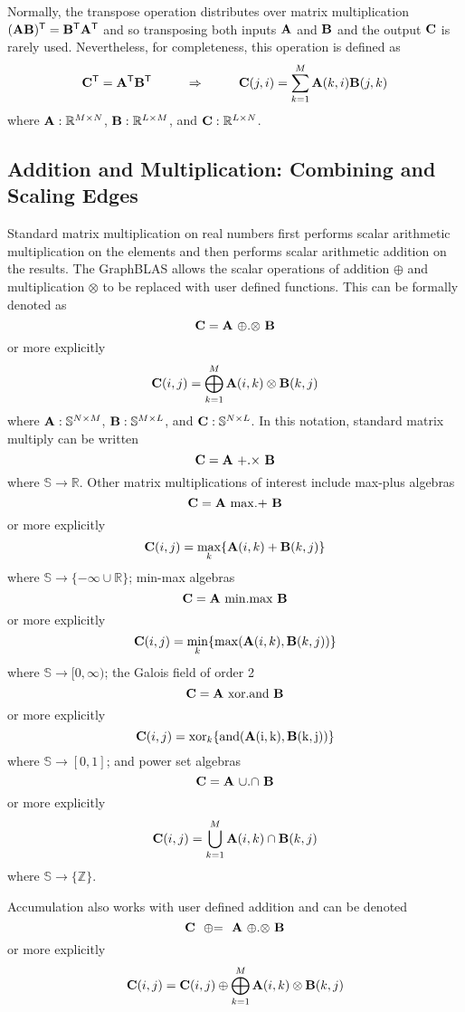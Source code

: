 Normally, the transpose operation distributes over matrix multiplication $({\bf A} {\bf B})^{\sf T} ={\bf B}^{\sf T} {\bf A}^{\sf T}$ and so transposing both inputs ${\bf A}$ and ${\bf B}$ and the output ${\bf C}$ is rarely used.  Nevertheless, for completeness, this operation is defined as
$$
   {\bf C}^{\sf T} = {\bf A}^{\sf T} {\bf B}^{\sf T} ~~~~~~~~ \Rightarrow ~~~~~~~~ {\bf C}(j,i) = \sum_{k=1}^M {\bf A}(k,i) {\bf B}(j,k)
$$
where ${\bf A}: \mathbb{R}^{M \times N}$, ${\bf B}: \mathbb{R}^{L \times M}$, and ${\bf C}: \mathbb{R}^{L \times N}$.

\subsection{Addition and Multiplication: Combining and Scaling Edges}
  Standard matrix multiplication on real numbers first performs scalar arithmetic multiplication on the elements and then performs scalar arithmetic addition on the results.  The GraphBLAS allows the scalar operations of addition $\oplus$ and multiplication $\otimes$ to be replaced with user defined functions.  This can be formally denoted as
$$
   {\bf C} = {\bf A} ~ {\oplus}.{\otimes} ~ {\bf B}
$$
or more explicitly
$$
   {\bf C}(i,j) = \bigoplus_{k=1}^M {\bf A}(i,k) \otimes {\bf B}(k,j)
$$
where ${\bf A}: \mathbb{S}^{N \times M}$,  ${\bf B}: \mathbb{S}^{M \times L}$, and ${\bf C}: \mathbb{S}^{N \times L}$.  In this notation, standard matrix multiply can be written
$$
   {\bf C} = {\bf A} ~ {+}.{\times} ~ {\bf B}
$$
where $\mathbb{S} \rightarrow \mathbb{R}$. Other matrix multiplications of interest include max-plus algebras
$$
   {\bf C} = {\bf A} ~ {\max}.{+} ~ {\bf B}
$$
or more explicitly
$$
   {\bf C}(i,j) = \max_k \{{\bf A}(i,k) + {\bf B}(k,j)\}
$$
where $\mathbb{S} \rightarrow \{-\infty \cup \mathbb{R}\}$; min-max algebras
$$
   {\bf C} = {\bf A} ~ {\min}.{\max} ~ {\bf B}
$$
or more explicitly
$$
   {\bf C}(i,j) = \min_k \{\max({\bf A}(i,k),{\bf B}(k,j))\}
$$
where $\mathbb{S} \rightarrow [0,\infty)$; the Galois field of order 2
$$
   {\bf C} = {\bf A} ~ {\rm xor}.{\rm and} ~ {\bf B}
$$
or more explicitly
$$
   {\bf C}(i,j) = {\rm xor}_k \{\rm and({\bf A}(i,k),{\bf B}(k,j))\}
$$
where $\mathbb{S} \rightarrow [0,1]$; and power set algebras
$$
   {\bf C} = {\bf A} ~ {\cup}.{\cap} ~ {\bf B}
$$
or more explicitly
$$
   {\bf C}(i,j) = \bigcup_{k=1}^M {\bf A}(i,k) \cap {\bf B}(k,j)
$$
where $\mathbb{S} \rightarrow \{\mathbb{Z}\}$.

  Accumulation also works with user defined addition and can be denoted
$$
   {\bf C} ~~ {\oplus}{=} ~~ {\bf A} ~ {\oplus}.{\otimes} ~ {\bf B}
$$
or more explicitly
$$
   {\bf C}(i,j) = {\bf C}(i,j) \oplus \bigoplus_{k=1}^M {\bf A}(i,k) \otimes {\bf B}(k,j)
$$



